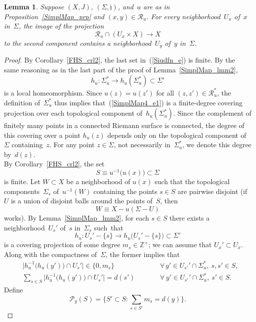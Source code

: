 \documentclass[11pt]{article}
\numberwithin{equation}{section}
\newtheorem{lmm}[thm]{Lemma}
\theoremstyle{definition}
\def\BE#1{\begin{equation}\label{#1}}
\def\EE{\end{equation}}
\def\eref#1{(\ref{#1})}
\def\lra{\longrightarrow}
\def\fj{\mathfrak j}
\def\cP{\mathcal P}
\def\cR{\mathcal R}
\def\Z{{\mathbb Z}}
\def\Si{\Sigma}
\begin{document}
\begin{lmm}\label{SimplMap_lmm4}
Suppose $(X,J)$, $(\Si,\fj)$, and~$u$ are as in Proposition~\ref{SimplMap_prp}
and $(x,y)\!\in\!\cR_u$.
For every neighborhood~$U_x$ of~$x$ in~$\Si$, the image of the projection
$$\cR_u\cap (U_x\!\times\!X)\lra X$$
to the second component contains a neighborhood~$U_y$ of~$y$ in~$\Si$.
\end{lmm}

\begin{proof}
By Corollary~\ref{FHS_crl2}, the last set in~\eref{Siudfn_e} is finite.
By the same reasoning as in the last part of the proof of  Lemma~\ref{SimplMap_lmm2},
\BE{SimplMap4_e1}h_u\!:\Si_u^*\lra h_u(\Si_u^*)\subset \Si'\EE
is a local homeomorphism. 
Since $u(z)\!=\!u(z')$ for all $(z,z')\!\in\!\cR_u^*$, 
the definition of~$\Si_u^*$ thus implies that~\eref{SimplMap4_e1} 
is a finite-degree covering projection over each topological component of~$h_u(\Si_u^*)$.
Since the complement of finitely many points in a connected Riemann surface is connected,
the degree of this covering over a point $h_u(z)$ depends only on the topological component
of~$\Si$ containing~$z$.
For any point $z\!\in\!\Si$, not necessarily in~$\Si_u^*$, we denote this degree by~$d(z)$.\\

\noindent
By Corollary~\ref{FHS_crl2}, the set 
$$S\equiv u^{-1}\big(u(x)\big)\subset \Si$$
is finite. 
Let $W\!\subset\!X$ be a neighborhood of $u(x)$ such that the topological components~$\Si_s$
of~$u^{-1}(W)$ containing the points $s\!\in\!S$ are pairwise disjoint
(if $U$ is a union of disjoint balls around the points of~$S$, then
$$W \equiv X-u(\Si\!-\!U)$$
works).
By Lemma~\ref{SimplMap_lmm2}, for each $s\!\in\!S$ there exists a neighborhood~$U_s'$
of~$s$ in~$\Si_s$ such~that 
$$h_u\!: U_s'\!-\!\{s\}\lra h_u\big(U_s'\!-\!\{s\}\big)\subset \Si'$$
is a covering projection of some degree $m_s\!\in\!\Z^+$;
we can assume that $U_x'\!\subset\!U_x$.
Along with  the compactness of~$\Si$, the former implies that
\BE{SimplMap4_e3}\begin{aligned}
&\big|h_u^{-1}\big(h_u(y')\big)\cap U_s'\big|\in \big\{0,m_s\big\}
&\qquad &\forall\,y'\!\in\!U_{s'}'\!\cap\!\Si_u^*,~s,s'\!\in\!S, \\
&\sum_{s\in S}\big|h_u^{-1}\big(h_u(y')\big)\cap U_s'\big|=d(s')
&\qquad
&\forall~y'\!\in\!U_{s'}'\!\cap\!\Si_u^*,~s'\!\in\!S.
\end{aligned}\EE
Define
$$\cP_y(S)=\big\{S'\!\subset\!S\!:\sum_{s\in S'}\!m_s\!=\!d(y)\big\}.$$


\end{proof}
\end{document}
